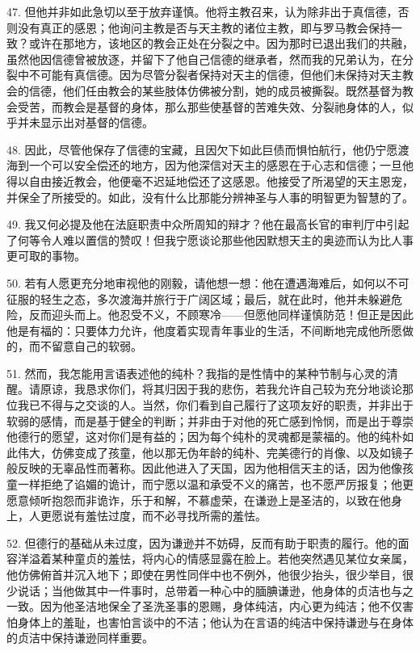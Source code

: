 47. 但他并非如此急切以至于放弃谨慎。他将主教召来，认为除非出于真信德，否则没有真正的感恩；他询问主教是否与天主教的诸位主教，即与罗马教会保持一致？或许在那地方，该地区的教会正处在分裂之中。因为那时已退出我们的共融，虽然他因信德曾被放逐，并留下了他自己信德的继承者，然而我的兄弟认为，在分裂中不可能有真信德。因为尽管分裂者保持对天主的信德，但他们未保持对天主教会的信德，他们任由教会的某些肢体仿佛被分割，她的成员被撕裂。既然基督为教会受苦，而教会是基督的身体，那么那些使基督的苦难失效、分裂祂身体的人，似乎并未显示出对基督的信德。\par

48. 因此，尽管他保存了信德的宝藏，且因欠下如此巨债而惧怕航行，他仍宁愿渡海到一个可以安全偿还的地方，因为他深信对天主的感恩在于心志和信德；一旦他得以自由接近教会，他便毫不迟延地偿还了这感恩。他接受了所渴望的天主恩宠，并保全了所接受的。如此，没有什么比那能分辨神圣与人事的明智更为智慧的了。\par

49. 我又何必提及他在法庭职责中众所周知的辩才？他在最高长官的审判厅中引起了何等令人难以置信的赞叹！但我宁愿谈论那些他因默想天主的奥迹而认为比人事更可取的事物。\par

50. 若有人愿更充分地审视他的刚毅，请他想一想：他在遭遇海难后，如何以不可征服的轻生之态，多次渡海并旅行于广阔区域；最后，就在此时，他并未躲避危险，反而迎头而上。他忍受不义，不顾寒冷——但愿他同样谨慎防范！但正是因此他是有福的：只要体力允许，他度着实现青年事业的生活，不间断地完成他所愿做的，而不留意自己的软弱。\par

51. 然而，我怎能用言语表述他的纯朴？我指的是性情中的某种节制与心灵的清醒。请原谅，我恳求你们，将其归因于我的悲伤，若我允许自己较为充分地谈论那位我已不得与之交谈的人。当然，你们看到自己履行了这项友好的职责，并非出于软弱的感情，而是基于健全的判断；并非由于对他的死亡感到怜悯，而是出于尊崇他德行的愿望，这对你们是有益的；因为每个纯朴的灵魂都是蒙福的。他的纯朴如此伟大，仿佛变成了孩童，他以那无伪年龄的纯朴、完美德行的肖像、以及如镜子般反映的无辜品性而著称。因此他进入了天国，因为他相信天主的话，因为他像孩童一样拒绝了谄媚的诡计，而宁愿以温和承受不义的痛苦，也不愿严厉报复；他更愿意倾听抱怨而非诡诈，乐于和解，不慕虚荣，在谦逊上是圣洁的，以致在他身上，人更愿说有羞怯过度，而不必寻找所需的羞怯。\par

52. 但德行的基础从未过度，因为谦逊并不妨碍，反而有助于职责的履行。他的面容洋溢着某种童贞的羞怯，将内心的情感显露在脸上。若他突然遇见某位女亲属，他仿佛俯首并沉入地下；即使在男性同伴中也不例外，他很少抬头，很少举目，很少说话；当他做其中一件事时，总带着一种心中的腼腆谦逊，他身体的贞洁也与之一致。因为他圣洁地保全了圣洗圣事的恩赐，身体纯洁，内心更为纯洁；他不仅害怕身体上的羞耻，也害怕言谈中的不洁；他认为在言语的纯洁中保持谦逊与在身体的贞洁中保持谦逊同样重要。\par


